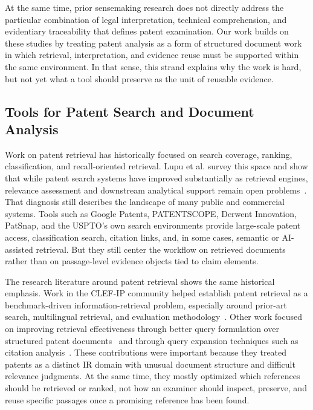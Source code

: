 \documentclass[sigconf]{acmart}
\begin{document}
At the same time, prior sensemaking research does not directly address the
particular combination of legal interpretation, technical comprehension, and
evidentiary traceability that defines patent examination. Our work builds on
these studies by treating patent analysis as a form of structured document work
in which retrieval, interpretation, and evidence reuse must be supported within
the same environment. In that sense, this strand explains why the work is hard,
but not yet what a tool should preserve as the unit of reusable evidence.

\subsection{Tools for Patent Search and Document Analysis}

Work on patent retrieval has historically focused on search coverage, ranking,
classification, and recall-oriented retrieval. Lupu et al. survey this space
and show that while patent search systems have improved substantially as
retrieval engines, relevance assessment and downstream analytical support remain
open problems~\cite{Lupu2013}. That diagnosis still describes the landscape of
many public and commercial systems. Tools such as Google Patents, PATENTSCOPE,
Derwent Innovation, PatSnap, and the USPTO's own search environments provide
large-scale patent access, classification search, citation links, and, in some
cases, semantic or AI-assisted retrieval. But they still center the workflow on
retrieved documents rather than on passage-level evidence objects tied to claim
elements.

The research literature around patent retrieval shows the same historical
emphasis. Work in the CLEF-IP community helped establish patent retrieval as a
benchmark-driven information-retrieval problem, especially around prior-art
search, multilingual retrieval, and evaluation methodology~\cite{Piroi2011}.
Other work focused on improving retrieval effectiveness through better query
formulation over structured patent documents~\cite{Magdy2010} and through query
expansion techniques such as citation analysis~\cite{Mahdabi2013}. These
contributions were important because they treated patents as a distinct IR
domain with unusual document structure and difficult relevance judgments. At
the same time, they mostly optimized which references should be retrieved or
ranked, not how an examiner should inspect, preserve, and reuse specific
passages once a promising reference has been found.
\end{document}
